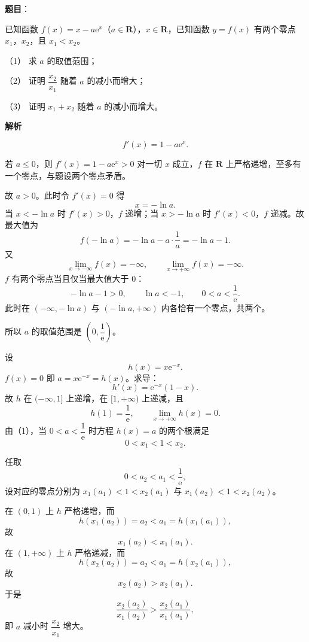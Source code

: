 \begin{answer}

\textbf{题目}：

已知函数 $f(x)=x-a\mathrm e^x$（$a\in\mathbf R$），$x\in\mathbf R$，已知函数 $y=f(x)$ 有两个零点 $x_1$，$x_2$，且 $x_1<x_2$。

（1） 求 $a$ 的取值范围；

（2） 证明 $\dfrac{x_2}{x_1}$ 随着 $a$ 的减小而增大；

（3） 证明 $x_1+x_2$ 随着 $a$ 的减小而增大。

\textbf{解析}


\nopagebreak[4]
\[f'(x)=1-a\mathrm e^x.\]

若 $a\leqslant0$，则 $f'(x)=1-a\mathrm e^x>0$ 对一切 $x$ 成立，$f$ 在 $\mathbf R$ 上严格递增，至多有一个零点，与题设两个零点矛盾。

故 $a>0$。此时令 $f'(x)=0$ 得
\nopagebreak[4]
\[x=-\ln a.\]
当 $x<-\ln a$ 时 $f'(x)>0$，$f$ 递增；当 $x>-\ln a$ 时 $f'(x)<0$，$f$ 递减。故最大值为
\nopagebreak[4]
\[f(-\ln a)=-\ln a-a\cdot\frac1a=-\ln a-1.\]
又
\nopagebreak[4]
\[\lim_{x\to-\infty}f(x)=-\infty,\qquad \lim_{x\to+\infty}f(x)=-\infty.\]
$f$ 有两个零点当且仅当最大值大于 $0$：
\nopagebreak[4]
\[-\ln a-1>0,\qquad \ln a<-1,\qquad 0<a<\frac1{\mathrm e}.\]
此时在 $(-\infty,-\ln a)$ 与 $(-\ln a,+\infty)$ 内各恰有一个零点，共两个。

所以 $a$ 的取值范围是 $\left(0,\dfrac1{\mathrm e}\right)$。


设
\nopagebreak[4]
\[h(x)=x\mathrm e^{-x}.\]
$f(x)=0$ 即 $a=x\mathrm e^{-x}=h(x)$。求导：
\nopagebreak[4]
\[h'(x)=\mathrm e^{-x}(1-x).\]
故 $h$ 在 $(-\infty,1]$ 上递增，在 $[1,+\infty)$ 上递减，且
\nopagebreak[4]
\[h(1)=\frac1{\mathrm e},\qquad \lim_{x\to+\infty}h(x)=0.\]
由（1），当 $0<a<\dfrac1{\mathrm e}$ 时方程 $h(x)=a$ 的两个根满足
\nopagebreak[4]
\[0<x_1<1<x_2.\]

任取
\nopagebreak[4]
\[0<a_2<a_1<\frac1{\mathrm e},\]
设对应的零点分别为 $x_1(a_1)<1<x_2(a_1)$ 与 $x_1(a_2)<1<x_2(a_2)$。

在 $(0,1)$ 上 $h$ 严格递增，而
\nopagebreak[4]
\[h(x_1(a_2))=a_2<a_1=h(x_1(a_1)),\]
故
\nopagebreak[4]
\[x_1(a_2)<x_1(a_1).\]
在 $(1,+\infty)$ 上 $h$ 严格递减，而
\nopagebreak[4]
\[h(x_2(a_2))=a_2<a_1=h(x_2(a_1)),\]
故
\nopagebreak[4]
\[x_2(a_2)>x_2(a_1).\]
于是
\nopagebreak[4]
\[\frac{x_2(a_2)}{x_1(a_2)}>\frac{x_2(a_1)}{x_1(a_1)},\]
即 $a$ 减小时 $\dfrac{x_2}{x_1}$ 增大。


\end{answer}
